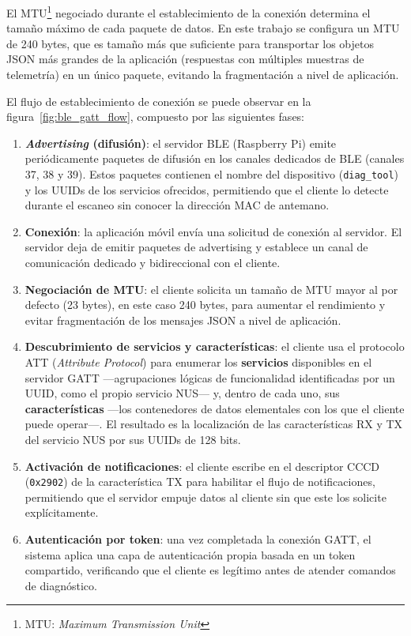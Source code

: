 El MTU\footnote{MTU: \textit{Maximum Transmission Unit}} negociado durante el establecimiento de la conexión determina el tamaño máximo de cada paquete de datos. En este trabajo se configura un MTU de 240 bytes, que es tamaño más que suficiente para transportar los objetos JSON más grandes de la aplicación (respuestas con múltiples muestras de telemetría) en un único paquete, evitando la fragmentación a nivel de aplicación.

El flujo de establecimiento de conexión se puede observar en la figura~\ref{fig:ble_gatt_flow}, compuesto por las siguientes fases:

\begin{enumerate}
    \item \textbf{\textit{Advertising} (difusión)}: el servidor BLE (Raspberry Pi) emite periódicamente paquetes de difusión en los canales dedicados de BLE (canales 37, 38 y 39). Estos paquetes contienen el nombre del dispositivo (\texttt{diag\_tool}) y los UUIDs de los servicios ofrecidos, permitiendo que el cliente lo detecte durante el escaneo sin conocer la dirección MAC de antemano.

    \item \textbf{Conexión}: la aplicación móvil envía una solicitud de conexión al servidor. El servidor deja de emitir paquetes de advertising y establece un canal de comunicación dedicado y bidireccional con el cliente.

    \item \textbf{Negociación de MTU}: el cliente solicita un tamaño de MTU mayor al por defecto (23 bytes), en este caso 240 bytes, para aumentar el rendimiento y evitar fragmentación de los mensajes JSON a nivel de aplicación.
\vspace{1cm}
    \item \textbf{Descubrimiento de servicios y características}: el cliente usa el protocolo ATT (\textit{Attribute Protocol}) para enumerar los \textbf{servicios} disponibles en el servidor GATT —agrupaciones lógicas de funcionalidad identificadas por un UUID, como el propio servicio NUS— y, dentro de cada uno, sus \textbf{características} —los contenedores de datos elementales con los que el cliente puede operar—. El resultado es la localización de las características RX y TX del servicio NUS por sus UUIDs de 128 bits.

    \item \textbf{Activación de notificaciones}: el cliente escribe en el descriptor CCCD (\texttt{0x2902}) de la característica TX para habilitar el flujo de notificaciones, permitiendo que el servidor empuje datos al cliente sin que este los solicite explícitamente.

    \item \textbf{Autenticación por token}: una vez completada la conexión GATT, el sistema aplica una capa de autenticación propia basada en un token compartido, verificando que el cliente es legítimo antes de atender comandos de diagnóstico.
\end{enumerate}

